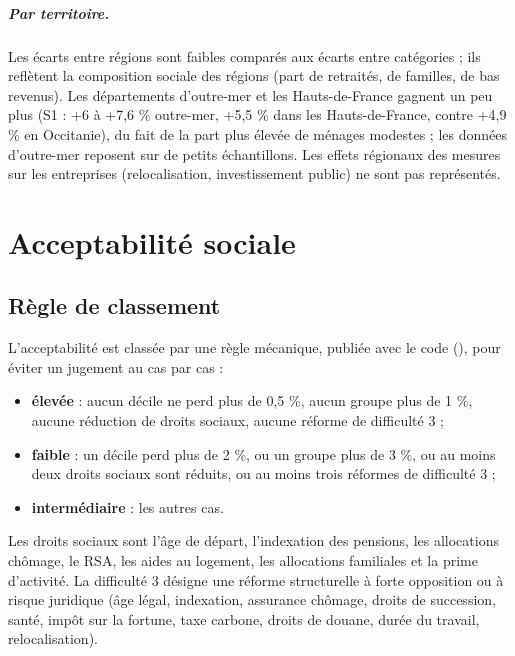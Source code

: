 \paragraph{Par territoire.} Les écarts entre régions sont faibles comparés aux écarts entre catégories ; ils
reflètent la composition sociale des régions (part de retraités, de familles, de bas revenus). Les départements
d'outre-mer et les Hauts-de-France gagnent un peu plus (S1 : +6 à +7,6 \% outre-mer, +5,5 \% dans les Hauts-de-France,
contre +4,9 \% en Occitanie), du fait de la part plus élevée de ménages modestes ; les données d'outre-mer reposent
sur de petits échantillons. Les effets régionaux des mesures sur
les entreprises (relocalisation, investissement public) ne sont pas représentés.

\begin{table}[htbp]\centering\scriptsize
\caption{Variation du niveau de vie par région (€ par unité de consommation et par an).}
\end{table}

\chapter{Acceptabilité sociale}\label{ch:acceptabilite}

\section{Règle de classement}

L'acceptabilité est classée par une règle mécanique, publiée avec le code (), pour
éviter un jugement au cas par cas :
\begin{itemize}
\item \textbf{élevée} : aucun décile ne perd plus de 0,5 \%, aucun groupe plus de 1 \%, aucune réduction de droits
sociaux, aucune réforme de difficulté 3 ;
\item \textbf{faible} : un décile perd plus de 2 \%, ou un groupe plus de 3 \%, ou au moins deux droits sociaux sont
réduits, ou au moins trois réformes de difficulté 3 ;
\item \textbf{intermédiaire} : les autres cas.
\end{itemize}
Les droits sociaux sont l'âge de départ, l'indexation des pensions, les allocations chômage, le RSA, les aides au
logement, les allocations familiales et la prime d'activité. La difficulté 3 désigne une réforme structurelle à forte
opposition ou à risque juridique (âge légal, indexation, assurance chômage, droits de succession, santé, impôt sur la
fortune, taxe carbone, droits de douane, durée du travail, relocalisation).

